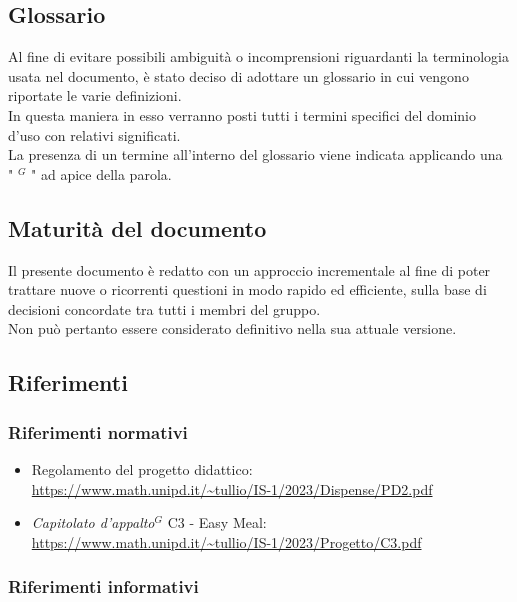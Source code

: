     \subsection{Glossario}

    Al fine di evitare possibili ambiguità o incomprensioni riguardanti la terminologia usata nel documento, è stato deciso di adottare un glossario in cui vengono riportate le varie definizioni. \\
    In questa maniera in esso verranno posti tutti i termini specifici del dominio d’uso con relativi significati. \\
    La presenza di un termine all’interno del glossario viene indicata applicando una " $^{G}$ " ad apice della parola.


    \subsection{Maturità del documento}

    Il presente documento è redatto con un approccio incrementale al fine di poter trattare nuove o ricorrenti questioni in modo rapido ed efficiente, sulla base di decisioni concordate tra tutti i membri del gruppo. \\
    Non può pertanto essere considerato definitivo nella sua attuale versione.

    \subsection{Riferimenti}

        \subsubsection{Riferimenti normativi}

        \begin{itemize}
            \item Regolamento del progetto didattico: \\
            \url{https://www.math.unipd.it/~tullio/IS-1/2023/Dispense/PD2.pdf}
          \item \emph{Capitolato d’appalto}$^{G}$ C3 - Easy Meal: \\
            \url{https://www.math.unipd.it/~tullio/IS-1/2023/Progetto/C3.pdf}
        \end{itemize}

        \subsubsection{Riferimenti informativi}

